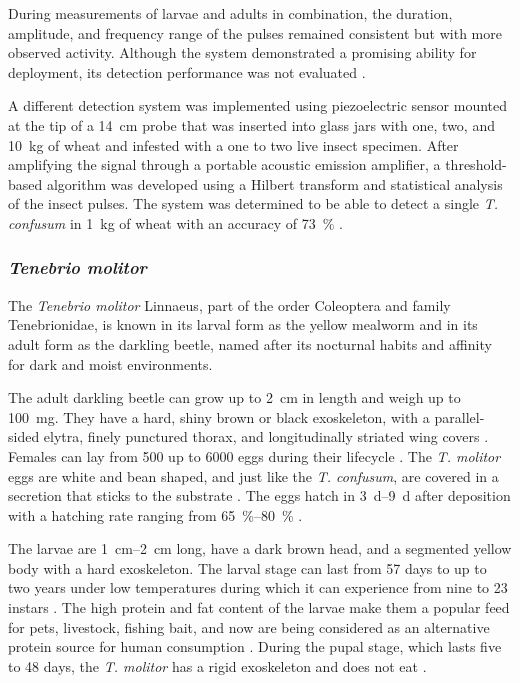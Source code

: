 \documentclass[../Vibro-Acoustic Signatures and Detection Algorithms for Stored Product Insects.tex]{subfiles}
\begin{document}
During measurements of larvae and adults in combination, the duration, amplitude, and frequency range of the pulses remained consistent but with more observed activity. Although the system demonstrated a promising ability for deployment, its detection performance was not evaluated \cite{mousaviAcousticDetectionPossibility2017}.

A different detection system was implemented using piezoelectric sensor mounted at the tip of a \SI{14}{\centi\meter} probe that was inserted into glass jars with one, two, and \SI{10}{\kilo\gram} of wheat and infested with a one to two live insect specimen. After amplifying the signal through a portable acoustic emission amplifier, a threshold-based algorithm was developed using a Hilbert transform and statistical analysis of the insect pulses. The system was determined to be able to detect a single \textit{T. confusum} in \SI{1}{\kilo\gram} of wheat with an accuracy of \SI{73}{\percent} \cite{eliopoulosDetectionAdultBeetles2015}.

\newpage
\subsubsection{\textit{Tenebrio molitor}}

The \textit{Tenebrio molitor} Linnaeus, part of the order Coleoptera and family Tenebrionidae, is known in its larval form as the yellow mealworm and in its adult form as the darkling beetle, named after its nocturnal habits and affinity for dark and moist environments.

The adult darkling beetle can grow up to \SI{2}{\centi\meter} in length and weigh up to \SI{100}{\milli\gram}. They have a hard, shiny brown or black exoskeleton, with a parallel-sided elytra, finely punctured thorax, and longitudinally striated wing covers \cite{adamaki-sotirakiStoredproductPestPromising2025}. Females can lay from 500  up to 6000 eggs during their lifecycle \cite{StoredGrainInsects2016}. The \textit{T. molitor} eggs are white and bean shaped, and just like the \textit{T. confusum}, are covered in a secretion that sticks to the substrate \cite{StoredGrainInsects2016}. The eggs hatch in \SIrange{3}{9}{\day} after deposition with a hatching rate ranging from \SIrange{65}{80}{\percent} \cite{adamaki-sotirakiStoredproductPestPromising2025}.

The larvae are \SIrange{1}{2}{\centi\meter} long, have a dark brown head, and a segmented yellow body with a hard exoskeleton. The larval stage can last from 57 days to up to two years under low temperatures during which it can experience from nine to 23 instars \cite{munoz-seijasCharacterizationAllLife2024}. The high protein and fat content of the larvae make them a popular feed for pets, livestock, fishing bait, and now are being considered as an alternative protein source for human consumption \cite{slowikHarmfulBeneficialSymbionts2023,munoz-seijasCharacterizationAllLife2024,yanSystematicReviewMicrobiological2025}. During the pupal stage, which lasts five to 48 days, the \textit{T. molitor} has a rigid exoskeleton and does not eat
\cite{munoz-seijasCharacterizationAllLife2024}.
\end{document}
